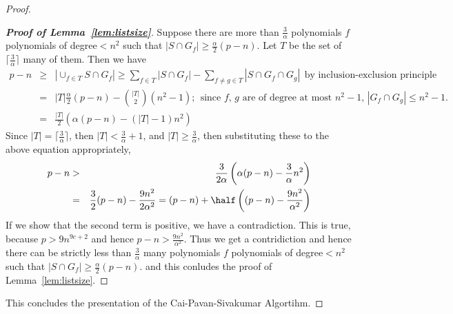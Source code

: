 \begin{proof}
\begin{proof}[{\em \textbf{Proof of Lemma~\ref{lem:listsize}}}] Suppose there are more than $\frac{3}{\alpha}$ polynomials $f$
polynomials of degree$<n^2$ such that $|S\cap G_f|\ge \frac{\alpha}{2}(p-n)$. Let $T$ be the set of $\lceil \frac{3}{\alpha} \rceil$ many of them. Then we have
\begin{eqnarray*}
p-n &\ge& |\cup_{f\in T} S\cap G_f| \ge \sum_{f\in T}|S\cap G_f| - \sum_{f\neq g\in T}|S\cap G_f \cap G_g|~~\mbox{by inclusion-exclusion principle}\\
&=& |T|\frac{\alpha}{2}(p-n)- {|T|\choose 2} (n^2-1);~~\mbox{since $f$, $g$ are of degree at most $n^2-1$, $|G_f\cap G_g|\le n^2-1$}.\\ 
&=& \frac{|T|}{2}\left(\alpha(p-n)- (|T|-1)n^2\right)
\end{eqnarray*}
Since $|T|=\lceil\frac{3}{\alpha} \rceil$, then $|T| < \frac{3}{\alpha}+1$, and $|T|\ge \frac{3}{\alpha}$, then substituting these to the above equation appropriately,
\begin{eqnarray*}
p-n& > & \frac{3}{2\alpha}\left(\alpha(p-n)- \frac{3}{\alpha} n^2 \right) \\
&=& \frac{3}{2}(p-n) - \frac{9n^2}{2\alpha^2} = (p-n) + \half\left((p-n) - \frac{9n^2}{\alpha^2}\right)\\
\end{eqnarray*}
If we show that the second term is positive, we have a contradiction. This is true, because $p > 9n^{9c+2}$ and hence $p-n > \frac{9n^2}{\alpha^2}$. Thus we get a contridiction and hence there can be strictly less than $\frac{3}{\alpha}$ many polynomials $f$
polynomials of degree$<n^2$ such that $|S\cap G_f|\ge \frac{\alpha}{2}(p-n)$. and this conludes the proof of Lemma~\ref{lem:listsize}.
\end{proof}
This concludes the presentation of the Cai-Pavan-Sivakumar Algortihm.
\end{proof}